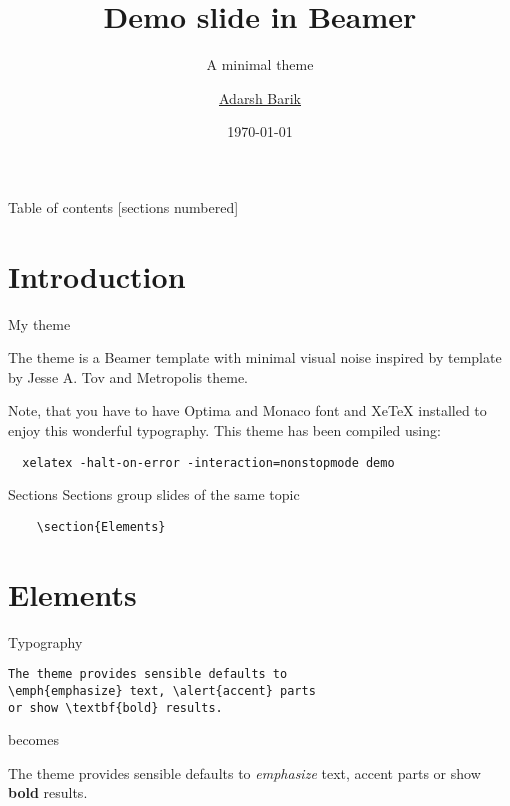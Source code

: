 \documentclass[xetex]{beamer}
\title{Demo slide in Beamer}
\subtitle{A minimal theme}
\date{\today}
\author{\underline{Adarsh Barik}}
\institute{Purdue University}
\begin{document}
\maketitle

\begin{frame}{Table of contents}
  [sections numbered]
  \tableofcontents[hideallsubsections]
\end{frame}

\section{Introduction}

\begin{frame}[fragile]{My theme}

  The  theme is a Beamer template with minimal visual noise inspired by template by Jesse A. Tov and Metropolis theme.


  Note, that you have to have Optima and Monaco font and XeTeX
  installed to enjoy this wonderful typography. This theme has been compiled using:
  \begin{verbatim}
  xelatex -halt-on-error -interaction=nonstopmode demo
  \end{verbatim} 
\end{frame}

\begin{frame}[fragile]{Sections}
  Sections group slides of the same topic

  \begin{verbatim}    \section{Elements}\end{verbatim}


\end{frame}


\section{Elements}

\begin{frame}[fragile]{Typography}
      \begin{verbatim}The theme provides sensible defaults to
\emph{emphasize} text, \alert{accent} parts
or show \textbf{bold} results.\end{verbatim}

  \begin{center}becomes\end{center}

  The theme provides sensible defaults to \emph{emphasize} text,
  \alert{accent} parts or show \textbf{bold} results.
\end{frame}
\end{document}
